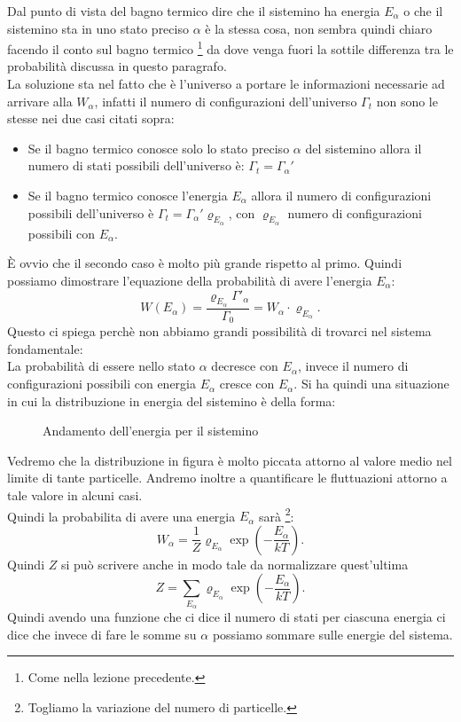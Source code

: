 Dal punto di vista del bagno termico dire che il sistemino ha energia $E_{\alpha}$ o che il sistemino sta in uno stato preciso $\alpha$ è la stessa cosa, non sembra quindi chiaro facendo il conto sul bagno termico \footnote{Come nella lezione precedente.} da dove venga fuori la sottile differenza tra le probabilità discussa in questo paragrafo.\\
La soluzione sta nel fatto che è l'universo a portare le informazioni necessarie ad arrivare alla $W_{\alpha}$, infatti il numero di configurazioni dell'universo $\Gamma_{t}$ non sono le stesse nei due casi citati sopra:
\begin{itemize}
	\item Se il bagno termico conosce solo lo stato preciso $\alpha$ del sistemino allora il numero di stati possibili dell'universo è: $\Gamma_{t}= \Gamma_{\alpha}'$
	\item Se il bagno termico conosce l'energia $E_{\alpha}$ allora il numero di configurazioni possibili dell'universo è $\Gamma_{t}= \Gamma_{\alpha}' \varrho_{E_{\alpha}}$, con $\varrho_{E_{\alpha}}$ numero di configurazioni possibili con $E_{\alpha}$.
\end{itemize}
È ovvio che il secondo caso è molto più grande rispetto al primo. Quindi possiamo dimostrare l'equazione della probabilità di avere l'energia $E_{\alpha}$:
\[
	W\left( E_{\alpha} \right)  = \frac{\varrho_{E_\alpha}\Gamma'_{\alpha}}{\Gamma_0} = W_{\alpha}\cdot \varrho_{E_{\alpha}}
.\] 
Questo ci spiega perchè non abbiamo grandi possibilità di trovarci nel sistema fondamentale: \\
La probabilità di essere nello stato $\alpha$ decresce con $E_{\alpha}$, invece il numero di configurazioni possibili con energia $E_{\alpha}$ cresce con $E_{\alpha}$. Si ha quindi una situazione in cui la distribuzione in energia del sistemino è della forma:
\begin{figure}[H]
    \centering
    \caption{Andamento dell'energia per il sistemino}
    \label{fig:andamento-energia-sistemino}
\end{figure}
\noindent
Vedremo che la distribuzione in figura è molto piccata attorno al valore medio nel limite di tante particelle. Andremo inoltre a quantificare le fluttuazioni attorno a tale valore in alcuni casi.\\
Quindi la probabilita di avere una energia $E_{\alpha}$ sarà \footnote{Togliamo la variazione del numero di particelle.}:
\[
	W_{\alpha} = \frac{1}{Z} \varrho_{E_{\alpha}} \exp\left( -\frac{E_{\alpha}}{kT} \right) 
.\]
Quindi $Z$ si può scrivere anche in modo tale da normalizzare quest'ultima 
\[
	Z = \sum_{E_{\alpha}}^{} \varrho_{E_{\alpha}}\exp\left( -\frac{E_{\alpha}}{kT} \right) 
.\] 
Quindi avendo una funzione che ci dice il numero di stati per ciascuna energia ci dice che invece di fare le somme su $\alpha$ possiamo sommare sulle energie del sistema.\\

